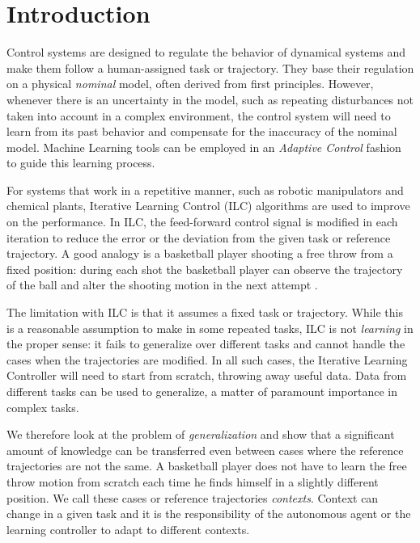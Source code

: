 \section{Introduction}

Control systems are designed to regulate the behavior of dynamical systems and make them follow a human-assigned task or trajectory. They base their regulation on a physical \emph{nominal} model, often derived from first principles. However, whenever there is an uncertainty in the model, such as repeating disturbances not taken into account in a complex environment, the control system will need to learn from its past behavior and compensate for the inaccuracy of the nominal model. Machine Learning tools can be employed in an \emph{Adaptive Control} fashion to guide this learning process.

For systems that work in a repetitive manner, such as robotic manipulators and chemical plants, Iterative Learning Control (ILC) algorithms are used to improve on the performance. In ILC, the feed-forward control signal is modified in each iteration to reduce the error or the deviation from the given task or reference trajectory. A good analogy is a basketball player shooting a free throw from a fixed position: during each shot the basketball player can observe the trajectory of the ball and alter the shooting motion in the next attempt \cite{Bristow06}. 

The limitation with ILC is that it assumes a fixed task or trajectory. While this is a reasonable assumption to make in some repeated tasks, ILC is not \emph{learning} in the proper sense: it fails to generalize over different tasks and cannot handle the cases when the trajectories are modified. In all such cases, the Iterative Learning Controller will need to start from scratch, throwing away useful data. Data from different tasks can be used to generalize, a matter of paramount importance in complex tasks. 

We therefore look at the problem of \emph{generalization} and show that a significant amount of knowledge can be transferred even between cases where the reference trajectories are not the same. A basketball player does not have to learn the free throw motion from scratch each time he finds himself in a slightly different position. We call these cases or reference trajectories \textit{contexts}. Context can change in a given task and it is the responsibility of the autonomous agent or the learning controller to adapt to different contexts. 

